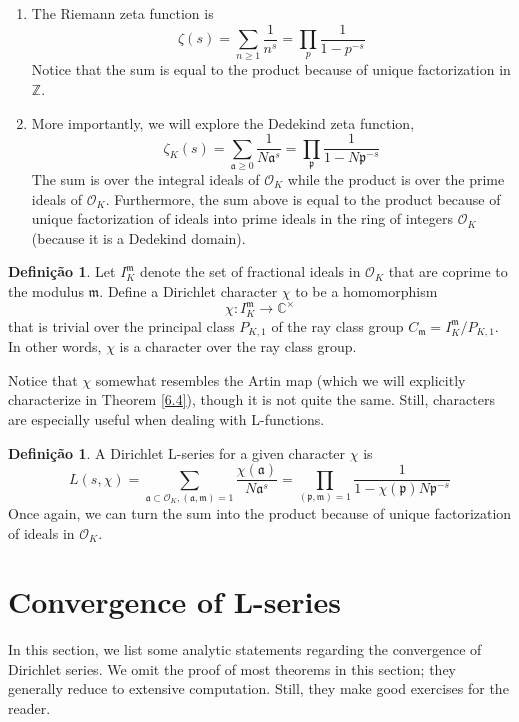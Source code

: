 \documentclass{article}
\newcommand{\CC}{\mathbb{C}}
\newcommand{\ZZ}{\mathbb{Z}}
\theoremstyle{plain}
\theoremstyle{definition}
\newtheorem{defn}[thm]{Definição}
\theoremstyle{remark}
\numberwithin{equation}{section}
\numberwithin{thm}{section}
\begin{document}
\begin{enumerate}
    \item The Riemann zeta function is $$\zeta(s) = \sum_{n \ge 1} \frac{1}{n^s} = \prod_{p} \frac{1}{1 - p^{-s}}$$ Notice that the sum is equal to the product because of unique factorization in $\ZZ$.
    \item More importantly, we will explore the Dedekind zeta function, $$\zeta_{K}(s) = \sum_{\mathfrak{a} \ge 0} \frac{1}{N\mathfrak{a}^s} = \prod_{\mathfrak{p}} \frac{1}{1 - N\mathfrak{p}^{-s}}$$ The sum is over the integral ideals of $\mathcal{O}_K$ while the product is over the prime ideals of $\mathcal{O}_K$. Furthermore, the sum above is equal to the product because of unique factorization of ideals into prime ideals in the ring of integers $\mathcal{O}_K$ (because it is a Dedekind domain).
\end{enumerate}

\begin{defn}
Let $I_{K}^{\mathfrak{m}}$ denote the set of fractional ideals in $\mathcal{O}_K$ that are coprime to the modulus $\mathfrak{m}$. Define a Dirichlet character $\chi$ to be a homomorphism $$\chi: I_{K}^{\mathfrak{m}} \longrightarrow \CC^{\times}$$ that is trivial over the principal class $P_{K, 1}$ of the ray class group $C_{\mathfrak{m}} = I_{K}^{\mathfrak{m}}/P_{K, 1}$. In other words, $\chi$ is a character over the ray class group.
\end{defn}

Notice that $\chi$ somewhat resembles the Artin map (which we will explicitly characterize in Theorem \ref{6.4}), though it is not quite the same. Still, characters are especially useful when dealing with L-functions.

\begin{defn}
A Dirichlet L-series for a given character $\chi$ is $$L(s, \chi) = \sum_{\mathfrak{a} \subset \mathcal{O}_K, (\mathfrak{a}, \mathfrak{m}) = 1} \frac{\chi(\mathfrak{a})}{N\mathfrak{a}^s} = \prod_{(\mathfrak{p}, \mathfrak{m}) = 1} \frac{1}{1 - \chi(\mathfrak{p})N\mathfrak{p}^{-s}}$$ Once again, we can turn the sum into the product because of unique factorization of ideals in $\mathcal{O}_K$.
\end{defn}

\section{Convergence of L-series}

In this section, we list some analytic statements regarding the convergence of Dirichlet series. We omit the proof of most theorems in this section; they generally reduce to extensive computation. Still, they make good exercises for the reader. 
\end{document}
